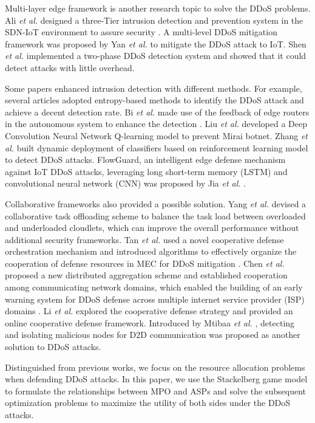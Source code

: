 \documentclass[conference]{IEEEtran}
\begin{document}
Multi-layer edge framework is another research topic to solve the DDoS problems. Ali \emph{et al.} designed a three-Tier intrusion detection and prevention system in the SDN-IoT environment to assure security \cite{Ali}. A multi-level DDoS mitigation framework \cite{Yan} was proposed by Yan \emph{et al.}  to mitigate the DDoS attack to IoT. Shen \emph{et al.} \cite{Shen} implemented a two-phase DDoS detection system and showed that it could detect attacks with little overhead.

Some papers enhanced intrusion detection with different methods. For example, several articles adopted entropy-based methods to identify the DDoS attack and achieve a decent detection rate\cite{Wang}\cite{Xuanyuan}. Bi \emph{et al.} made use of the feedback of edge routers in the autonomous system to enhance the detection \cite{Bi}. Liu \emph{et al.} developed a Deep Convolution Neural Network Q-learning model to prevent Mirai botnet\cite{Liu}. Zhang \emph{et al.} built dynamic deployment of classifiers based on reinforcement learning model to detect DDoS attacks\cite{Zhang}. FlowGuard, an intelligent edge defense mechanism against IoT DDoS attacks, leveraging long short-term memory (LSTM) and convolutional neural network (CNN) \cite{Jia} was proposed by Jia \emph{et al.} .

Collaborative frameworks also provided a possible solution. Yang \emph{et al.} devised a collaborative task offloading scheme to balance the task load between overloaded and underloaded cloudlets, which can improve the overall performance without additional security frameworks\cite{Yang}. Tan \emph{et al.} used a novel cooperative defense orchestration mechanism and introduced algorithms to effectively organize the cooperation of defense resources in MEC for DDoS mitigation \cite{Tan}. Chen \emph{et al.} proposed a new distributed aggregation scheme and established cooperation among communicating network
domains, which enabled the building of an early warning
system for DDoS defense across multiple internet service provider (ISP) domains \cite{Chen}. Li \emph{et al.} explored the cooperative defense strategy and provided an online cooperative defense framework\cite{Li}. Introduced by Mtibaa \emph{et al.} , detecting and isolating malicious nodes for D2D communication was proposed as another solution to DDoS attacks\cite{Mtibaa}. 

Distinguished from previous works, we focus on the resource allocation problems when defending DDoS attacks. In this paper, we use the Stackelberg game model to formulate
the relationships between MPO and ASPs and solve the subsequent optimization problems to maximize the utility of both sides under the DDoS attacks. 
\end{document}
